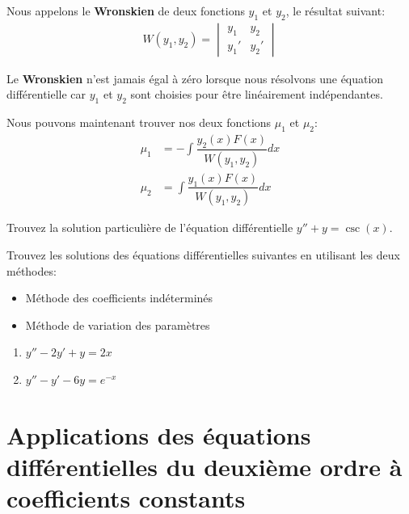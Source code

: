 \documentclass[]{book}
\providecommand{\tightlist}{%
  \setlength{\itemsep}{0pt}\setlength{\parskip}{0pt}}
\theoremstyle{definition}
\theoremstyle{definition}
\theoremstyle{definition}
\theoremstyle{remark}
\let\BeginKnitrBlock\begin \let\EndKnitrBlock\end
\begin{document}
\BeginKnitrBlock{definition}[Wronskien]
\protect\hypertarget{def:unnamed-chunk-88}{}{\label{def:unnamed-chunk-88}
{} }Nous appelons le \textbf{Wronskien} de deux
fonctions \(y_1\) et \(y_2\), le résultat suivant: \begin{align*}
W(y_1,y_2)=\begin{vmatrix}
y_1 &y_2\\
y_1'&y_2'
\end{vmatrix}
\end{align*}
\EndKnitrBlock{definition}

\BeginKnitrBlock{remark}
{}Le \textbf{Wronskien} n'est jamais égal à
zéro lorsque nous résolvons une équation différentielle car \(y_1\) et
\(y_2\) sont choisies pour être linéairement indépendantes.
\EndKnitrBlock{remark}

Nous pouvons maintenant trouver nos deux fonctions \(\mu_1\) et
\(\mu_2\): \begin{align*}
\mu_1&=-\int \dfrac{y_2(x)F(x)}{W(y_1,y_2)}dx\\
\mu_2&=\int \dfrac{y_1(x)F(x)}{W(y_1,y_2)}dx
\end{align*}

\BeginKnitrBlock{example}
\protect\hypertarget{exm:unnamed-chunk-90}{}{\label{exm:unnamed-chunk-90}
}Trouvez la solution particulière de l'équation différentielle
\(y''+y=\csc(x)\).
\EndKnitrBlock{example}
\vspace*{10cm}

\BeginKnitrBlock{example}
\protect\hypertarget{exm:unnamed-chunk-91}{}{\label{exm:unnamed-chunk-91}
}Trouvez les solutions des équations différentielles suivantes en
utilisant les deux méthodes:

\begin{itemize}
\tightlist
\item
  Méthode des coefficients indéterminés
\item
  Méthode de variation des paramètres
\end{itemize}

\begin{enumerate}
\def\labelenumi{\alph{enumi}.}
\tightlist
\item
  \(y''-2y'+y=2x\)
\item
  \(y''-y'-6y=e^{-x}\)
\end{enumerate}
\EndKnitrBlock{example}

\hypertarget{applications-des-equations-differentielles-du-deuxieme-ordre-a-coefficients-constants}{%
\section{Applications des équations différentielles du deuxième ordre à
coefficients
constants}\label{applications-des-equations-differentielles-du-deuxieme-ordre-a-coefficients-constants}}
\end{document}
